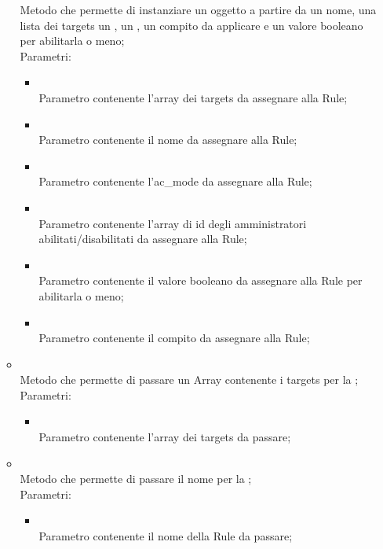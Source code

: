 \begin{itemize}
\begin{itemize}
		Metodo che permette di instanziare un oggetto  a partire da un nome, una lista dei targets un , un , un compito da applicare e un valore booleano per abilitarla o meno;\\
		Parametri:
		\begin{itemize}
			\item {} \\
			Parametro contenente l'array dei targets da assegnare alla Rule;
			\item {} \\
			Parametro contenente il nome da assegnare alla Rule;
			\item {} \\
			Parametro contenente l'ac\_mode da assegnare alla Rule;
			\item {} \\
			Parametro contenente l'array di id degli amministratori abilitati/disabilitati da assegnare alla Rule;
			\item {} \\
			Parametro contenente il valore booleano da assegnare alla Rule per abilitarla o meno;
			\item {} \\
			Parametro contenente il compito da assegnare alla Rule;
		\end{itemize}
		\item[]  \\
		Metodo che permette di passare un Array contenente i targets per la ;\\
		Parametri:
		\begin{itemize}
			\item {} \\
			Parametro contenente l'array dei targets da passare;
		\end{itemize}
		\item[]  \\
		Metodo che permette di passare il nome per la ;\\
		Parametri:
		\begin{itemize}
			\item {} \\
			Parametro contenente il nome della Rule da passare;
		\end{itemize}

\end{itemize}
\end{itemize}
